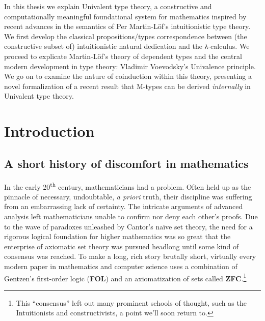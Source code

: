 \documentclass[12pt,twoside]{reedthesis}
\makeatletter
\let\oldindex\index
\renewcommand{\index}[1]
               {\oldindex{#1}\marginpar{\footnotesize\color{index}index: #1}}
\newcommand{\indeX}{\oldindex}
\newcommand{\indeX}{\index}
\newcommand{\abbreviation}[1]{\textbf{#1}\indeX{#1@\textbf{#1}}} %
\makeatother
\begin{document}
In this thesis we explain Univalent type theory, a constructive and
computationally meaningful foundational system for mathematics inspired by
recent advances in the semantics of Per Martin-L\"of's intuitionistic type
theory. We first develop the classical propositions/types correspondence between
(the constructive subset of) intuitionistic natural dedication and the
λ-calculus. We proceed to explicate Martin-L\"of's theory of dependent types and
the central modern development in type theory: Vladimir Voevodsky's Univalence
principle. We go on to examine the nature of coinduction within this theory,
presenting a novel formalization of a recent result that M-types can be derived
\textit{internally} in Univalent type theory.

\mainmatter %
\pagestyle{fancyplain} %

\chapter*{Introduction}

\section*{A short history of discomfort in mathematics}


In the early 20\textsuperscript{th} century, mathematicians had a problem. Often
held up as the pinnacle of necessary, undoubtable, \textit{a priori} truth,
their discipline was suffering from an embarrassing lack of certainty. The
intricate arguments of advanced analysis left mathematicians unable to confirm
nor deny each other's proofs. Due to the wave of paradoxes unleashed by
Cantor's na\"ive set theory, the need for a rigorous logical foundation for higher
mathematics was so great that the enterprise of axiomatic set theory was pursued
headlong until some kind of consensus was reached. To make a long, rich story
brutally short, virtually every modern paper in mathematics and computer
science uses a combination of Gentzen's first-order logic (\abbreviation{FOL})
and an axiomatization of sets called
\abbreviation{ZFC}.\footnote{This ``consensus'' left out many
  prominent schools of thought, such as the Intuitionists and constructivists, a
  point we'll soon return to.}
\end{document}
